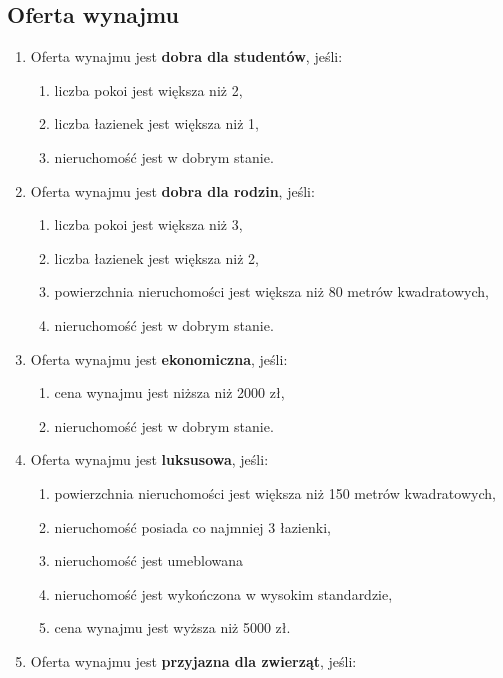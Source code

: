 \subsection{Oferta wynajmu}
\begin{enumerate}[label=W\arabic*.]
    \item Oferta wynajmu jest \textbf{dobra dla studentów}, jeśli:
    \begin{enumerate}[label=\arabic*.]
        \item liczba pokoi jest większa niż 2,
        \item liczba łazienek jest większa niż 1,
        \item nieruchomość jest w dobrym stanie.
    \end{enumerate}
    \item Oferta wynajmu jest \textbf{dobra dla rodzin}, jeśli:
    \begin{enumerate}[label=\arabic*.]
        \item liczba pokoi jest większa niż 3,
        \item liczba łazienek jest większa niż 2,
        \item powierzchnia nieruchomości jest większa niż 80 metrów kwadratowych,
        \item nieruchomość jest w dobrym stanie.
    \end{enumerate}
    \item Oferta wynajmu jest \textbf{ekonomiczna}, jeśli:
    \begin{enumerate}[label=\arabic*.]
        \item cena wynajmu jest niższa niż 2000 zł,
        \item nieruchomość jest w dobrym stanie.
    \end{enumerate}
    \item Oferta wynajmu jest \textbf{luksusowa}, jeśli:
    \begin{enumerate}[label=\arabic*.]
        \item powierzchnia nieruchomości jest większa niż 150 metrów kwadratowych,
        \item nieruchomość posiada co najmniej 3 łazienki,
        \item nieruchomość jest umeblowana
        \item nieruchomość jest wykończona w wysokim standardzie,
        \item cena wynajmu jest wyższa niż 5000 zł.
    \end{enumerate}
    \item Oferta wynajmu jest \textbf{przyjazna dla zwierząt}, jeśli:

\end{enumerate}
